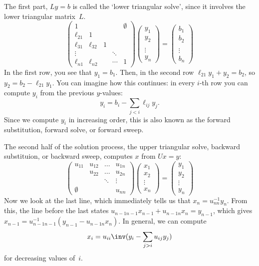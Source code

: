The first part, $Ly=b$ is called the `lower triangular solve', since
it involves the lower triangular matrix~$L$.
  \[ \left(
    \begin{matrix}
      1&&&&\emptyset\\ \ell_{21}&1\\ \ell_{31}&\ell_{32}&1\\
      \vdots&&&\ddots\\ \ell_{n1}&\ell_{n2}&&\cdots&1
    \end{matrix}\right) \left(
    \begin{matrix}
      y_1\\ y_2\\ \\ \vdots\\ y_n
    \end{matrix}\right) = \left(
    \begin{matrix}
      b_1\\ b_2\\ \\ \vdots\\ b_n
    \end{matrix}\right)
  \]
In the first row, you see that $y_1=b_1$. Then, in the second row
$\ell_{21}y_1+y_2=b_2$, so $y_2=b_2-\ell_{21}y_1$. You can imagine how
this continues: in every $i$-th row you can compute $y_i$ from the
previous $y$-values:
\[ y_i = b_i-\sum_{j<i} \ell_{ij}y_j. \]
Since we compute $y_i$ in increasing order, this is also known as
the forward substitution, forward solve, or forward sweep.
  

The second half of the solution process, the upper triangular solve,
backward substituion, or backward sweep, computes $x$ from $Ux=y$:
  \[ \left(
    \begin{matrix}
      u_{11}&u_{12}&\ldots&u_{1n}\\ &u_{22}&\ldots&u_{2n}\\
      &&\ddots&\vdots\\ \emptyset&&&u_{nn}
    \end{matrix}\right) \left(
    \begin{matrix}
      x_1\\ x_2\\ \vdots\\ x_n
    \end{matrix}\right)=\left(
    \begin{matrix}
      y_1\\ y_2\\ \vdots\\ y_n
    \end{matrix}\right)
  \]
Now we look at the last line, which immediately tells us that
$x_n=u_{nn}^{-1}y_n$.
From this, the line before the last states
$u_{n-1n-1}x_{n-1}+u_{n-1n}x_n=y_{n-1}$, which gives
$x_{n-1}=u_{n-1n-1}^{-1}(y_{n-1}-u_{n-1n}x_n)$.
In general, we can compute
\[ x_i=u_{ii}\inv (y_i-\sum_{j>i}u_{ij}y_j) \]
for decreasing values of~$i$.

